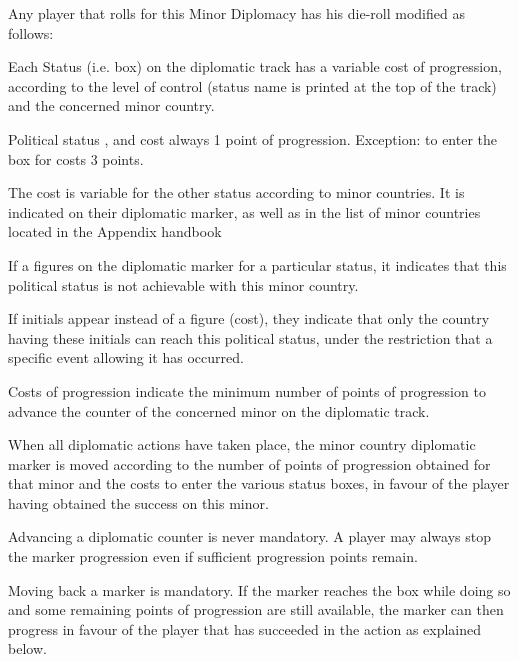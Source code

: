 \aparag[Modifiers] %
Any player that rolls for this Minor Diplomacy has his die-roll modified as
follows: \diplomod

Each Status (i.e. box) on the diplomatic track has a variable cost of
progression, according to the level of control (status name is printed at the
top of the track) and the concerned minor country.

\bparag Political status \Neutral, \RM and \SUB cost always 1 point of
progression. Exception: to enter the \SUB box for \paysSuisse costs 3 points.

\bparag The cost is variable for the other status according to minor
countries. It is indicated on their diplomatic marker, as well as in the list
of minor countries located in the Appendix handbook

\bparag If a \textetoile figures on the diplomatic marker for a particular
status, it indicates that this political status is not achievable with this
minor country.

\bparag If initials appear instead of a figure (cost), they indicate that only
the country having these initials can reach this political status, under the
restriction that a specific event allowing it has occurred.

Costs of progression indicate the minimum number of points of progression to
advance %
the counter of the concerned minor on the diplomatic track.

\bparag When all diplomatic actions have taken place, the minor country
diplomatic marker is moved according to the number of points of progression
obtained for that minor and the costs to enter the various status boxes, in
favour of the player having obtained the success on this minor.


\bparag Advancing a diplomatic counter is never mandatory. A player may always
stop the marker progression even if sufficient progression points remain.

\bparag Moving back a marker is mandatory. If the marker reaches the \Neutral
box while doing so and some remaining points of progression are still
available, the marker can then progress in favour of the player that has
succeeded in the action as explained below.

